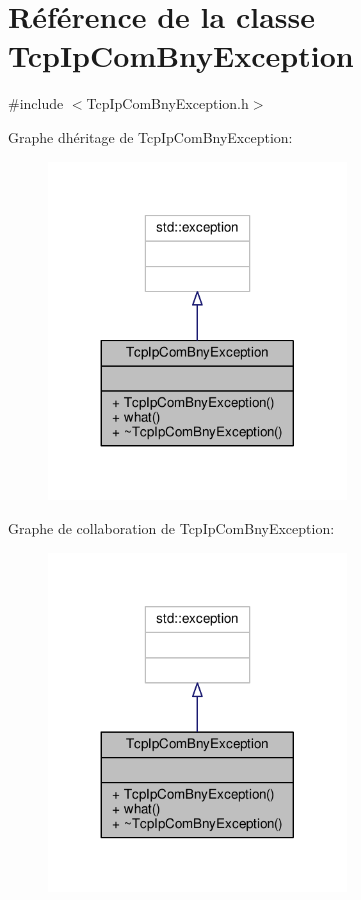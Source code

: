 \hypertarget{classTcpIpComBnyException}{}\section{Référence de la classe Tcp\+Ip\+Com\+Bny\+Exception}
\label{classTcpIpComBnyException}


{\ttfamily \#include $<$Tcp\+Ip\+Com\+Bny\+Exception.\+h$>$}



Graphe d\textquotesingle{}héritage de Tcp\+Ip\+Com\+Bny\+Exception\+:\nopagebreak
\begin{figure}[H]
\begin{center}
\leavevmode
\includegraphics[width=224pt]{classTcpIpComBnyException__inherit__graph}
\end{center}
\end{figure}


Graphe de collaboration de Tcp\+Ip\+Com\+Bny\+Exception\+:\nopagebreak
\begin{figure}[H]
\begin{center}
\leavevmode
\includegraphics[width=224pt]{classTcpIpComBnyException__coll__graph}
\end{center}
\end{figure}
